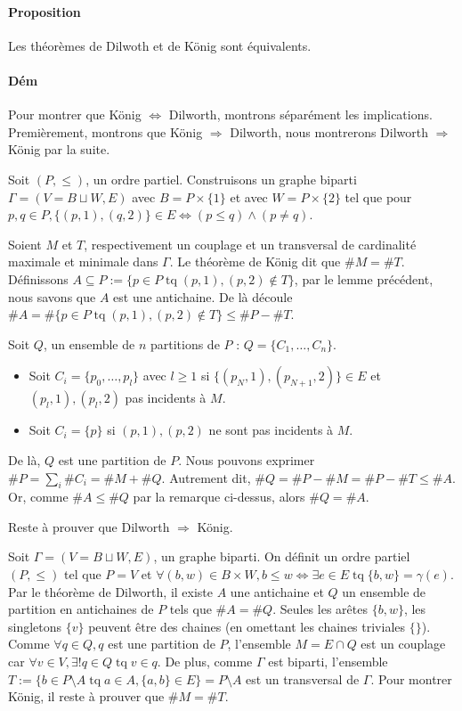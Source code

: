 \documentclass{article}
\DeclareMathOperator{\tq}{\text{ tq }}
\begin{document}
			\paragraph{Proposition} Les théorèmes de Dilwoth et de König sont équivalents.

			\paragraph{Dém} Pour montrer que König $\iff$ Dilworth, montrons séparément les implications. Premièrement, montrons que König
			$\Rightarrow$ Dilworth, nous montrerons Dilworth $\Rightarrow$ König par la suite.

			Soit $(P, \leq)$, un ordre partiel. Construisons un graphe biparti $\Gamma = (V = B \sqcup W, E)$ avec $B = P \times \{1\}$ et avec
			$W = P \times \{2\}$ tel que pour $p, q \in P, \{(p, 1), (q, 2)\} \in E \iff (p \leq q) \land (p \neq q)$.

			Soient $M$ et $T$, respectivement un couplage et un transversal de cardinalité maximale et minimale dans $\Gamma$. Le théorème de König
			dit que $\#M = \#T$. Définissons $A \subseteq P := \{p \in P \tq (p, 1), (p, 2) \not \in T\}$, par le lemme précédent, nous savons
			que $A$ est une antichaine. De là découle $\#A = \#\{p \in P \tq (p, 1), (p, 2) \not \in T\} \leq \#P - \#T$.

			Soit $Q$, un ensemble de $n$ partitions de $P$ : $Q = \{C_1, \ldots, C_n\}$.

			\begin{itemize}
				\item Soit $C_i = \{p_0, \ldots, p_l\}$ avec $l \geq 1$ si $\{(p_N, 1), (p_{N+1}, 2)\} \in E$ et $(p_l, 1), (p_l, 2)$ pas incidents
					  à $M$.
				\item Soit $C_i = \{p\}$ si $(p, 1), (p, 2)$ ne sont pas incidents à $M$.
			\end{itemize}

			De là, $Q$ est une partition de $P$. Nous pouvons exprimer $\#P = \sum_i \#C_i = \#M + \#Q$. Autrement dit, $\#Q = \#P - \#M = \#P - \#T
			\leq \#A$. Or, comme $\#A \leq \#Q$ par la remarque ci-dessus, alors $\#Q = \#A$.

			Reste à prouver que Dilworth $\Rightarrow$ König.

			Soit $\Gamma = (V = B \sqcup W, E)$, un graphe biparti. On définit un ordre partiel $(P, \leq)$ tel que $P = V$ et $\forall (b, w) \in
			B \times W, b \leq w \iff \exists e \in E \tq \{b, w\} = \gamma(e)$. Par le théorème de Dilworth, il existe $A$ une antichaine et
			$Q$ un ensemble de partition en antichaines de $P$ tels que $\#A = \#Q$. Seules les arêtes $\{b, w\}$, les singletons $\{v\}$ peuvent
			être des chaines (en omettant les chaines triviales $\{\}$). Comme $\forall q \in Q, q$ est une partition de $P$, l'ensemble $M = E \cap Q$
			est un couplage car $\forall v \in V, \exists! q \in Q \tq v \in q$. De plus, comme $\Gamma$ est biparti, l'ensemble
			$T := \{b \in P \setminus A \tq a \in A, \{a, b\} \in E\} = P \setminus A$ est un transversal de $\Gamma$.
			Pour montrer König, il reste à prouver que $\#M = \#T$.
\end{document}
